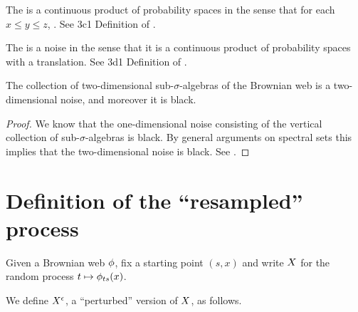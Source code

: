 {\begin{theorem}
  The \brownianwebnoise{}
  is a continuous product of probability spaces in the sense that
  for each $x \le y \le z$,  .
  See 3c1 Definition of
  \cite{tsirelson-nonclassical-stochastic-flows}.
\end{theorem}

\begin{theorem}
  The \brownianwebnoise{} is a noise in the sense that it is a
  continuous product of probability spaces with a translation.
  See 3d1 Definition of
  \cite{tsirelson-nonclassical-stochastic-flows}.
\end{theorem}

\begin{theorem}
  The collection of two-dimensional sub-$\sigma$-algebras of the
  Brownian web is a two-dimensional noise, and moreover it is black.
\end{theorem}

\begin{proof}
  We know that the one-dimensional noise consisting of the vertical
  collection of sub-$\sigma$-algebras is black.  By general arguments
  on spectral sets this implies that the two-dimensional noise is
  black.  See \cite{tsirelson-classicality-blackness-spectrum}.
\end{proof}

\section{Definition of the ``resampled'' process}

\newcommand{\reservoir}{\mathcal{G}}

\newcommand{\twostrips}{\commafactor{\infty}{0} \tensor \commafactor{0}{-\infty}}
\newcommand{\onestrip}{\commafactor{\infty}{-\infty}}
\newcommand{\twostripsreservoir}{\twostrips \tensor \reservoir}

\begin{definition}
Given a Brownian web $\phi$, fix a starting point $(s,x)$ and write
$X$ for the random process $t \mapsto \phi_{ts}(x)$.
\end{definition}

{
\newcommand{\webt}{\psi}
\begin{definition}
  We define $X^{\epsilon}$, a ``perturbed'' version of $X$, as
  follows.


\end{definition}}}
